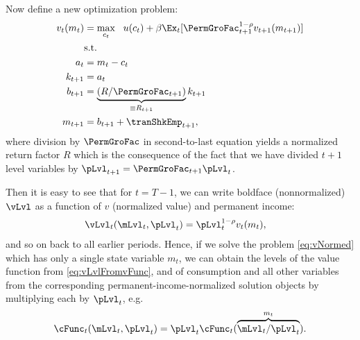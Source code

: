 Now define a new optimization problem:
  \begin{equation}\begin{gathered}\begin{aligned}
        v_{t}(m_{t}) & = \max_{{c}_{t}} ~~ u(c_{t})+{\beta}\Ex_{t}[ \PermGroFac_{t+1}^{1-\rho}v_{t+1}(m_{t+1})] \label{eq:vNormed}                   \\
                                         & \text{s.t.}                                                                                 \\
        a_{t}                       & = m_{t}-c_{t}                                                                     \\
        k_{t+1}                     & = a_{t}                                                                                \\
        b_{t+1}                     & = \underbrace{\left(R/\PermGroFac_{t+1}\right)}_{\equiv R_{t+1}}k_{t+1} \\
        m_{t+1}                        & = b_{t+1}+\tranShkEmp_{t+1},
      \end{aligned}\end{gathered}\end{equation}
where division by $\PermGroFac$ in second-to-last equation yields a normalized return factor $R$ which is the consequence of the fact that we have divided $t+1$ level variables by $\pLvl_{t+1}=\PermGroFac_{t+1}\pLvl_{t}$.

\ifpseudo{ %
\nopagebreak
  }{}
  
Then it is easy to see that for $t=T-1$, we can write boldface (nonnormalized) $\vLvl$ as a function of $v$ (normalized value) and permanent income:
\begin{equation}\begin{gathered}\begin{aligned}
      \vLvl_{t}(\mLvl_{t},\pLvl_{t}) & =  \pLvl_{t}^{1-\rho}v_{t}(m_{t}), \label{eq:vLvlFromvFunc}
    \end{aligned}\end{gathered}\end{equation}
and so on back to all earlier periods.  Hence, if we solve the problem \eqref{eq:vNormed} which has only a single state variable $m_{t}$, we can obtain the levels of the value function from \eqref{eq:vLvlFromvFunc}, and of consumption and all other variables from the corresponding permanent-income-normalized solution objects by multiplying each by $\pLvl_{t}$, e.g.\
\begin{equation*}\begin{gathered}\begin{aligned}
  \cFunc_{t}(\mLvl_{t},\pLvl_{t})=\pLvl_{t}\cFunc_{t}(\overbrace{\mLvl_{t}/\pLvl_{t}}^{m_{t}}).
    \end{aligned}\end{gathered}\end{equation*}

